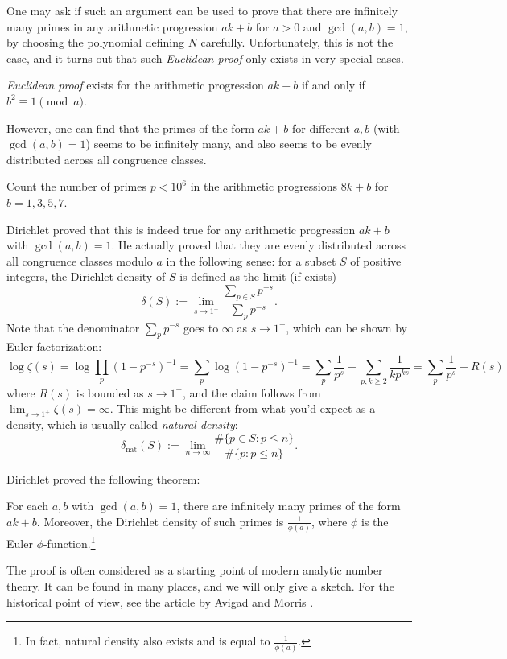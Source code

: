 One may ask if such an argument can be used to prove that there are infinitely many primes in any arithmetic progression $ak + b$ for $a > 0$ and $\gcd(a, b) = 1$, by choosing the polynomial defining $N$ carefully.
Unfortunately, this is not the case, and it turns out that such \emph{Euclidean proof} only exists in very special cases.
\begin{theorem}
    \emph{Euclidean proof} exists for the arithmetic progression $ak + b$ if and only if $b^2 \equiv 1 \pmod{a}$.
\end{theorem}
 
However, one can find that the primes of the form $ak + b$ for different $a, b$ (with $\gcd(a, b) = 1$) seems to be infinitely many, and also seems to be evenly distributed across all congruence classes.
\begin{exercise}\sage
    Count the number of primes $p < 10^6$ in the arithmetic progressions $8k + b$ for $b = 1, 3, 5, 7$.
\end{exercise}

Dirichlet \cite{dirichlet1837beweis} proved that this is indeed true for any arithmetic progression $ak + b$ with $\gcd(a, b) = 1$.
He actually proved that they are evenly distributed across all congruence classes modulo $a$ in the following sense: for a subset $S$ of positive integers, the Dirichlet density of $S$ is defined as the limit (if exists)
\begin{equation}
    \delta(S) := \lim_{s \to 1^+} \frac{\sum_{p \in S} p^{-s}}{\sum_{p} p^{-s}}.
    \label{eqn:dirichlet-density}
\end{equation}
Note that the denominator $\sum_p p^{-s}$ goes to $\infty$ as $s \to 1^+$, which can be shown by Euler factorization:
\[
\log \zeta(s) = \log \prod_p (1 - p^{-s})^{-1} = \sum_p \log(1 - p^{-s})^{-1} = \sum_p \frac{1}{p^s} + \sum_{p, k \ge 2} \frac{1}{k p^{ks}} = \sum_p \frac{1}{p^s} + R(s)
\]
where $R(s)$ is bounded as $s \to 1^+$, and the claim follows from $\lim_{s \to 1^+} \zeta(s) = \infty$.
This might be different from what you'd expect as a density, which is usually called \emph{natural density}:
\begin{equation}
    \delta_{\mathrm{nat}}(S) := \lim_{n \to \infty} \frac{\#\{p \in S : p \le n\}}{\#\{p : p \le n\}}.
\end{equation}

Dirichlet proved the following theorem:
\begin{theorem}
    \label{thm:dirichlet}
    For each $a, b$ with $\gcd(a, b) = 1$, there are infinitely many primes of the form $ak + b$.
    Moreover, the Dirichlet density of such primes is $\frac{1}{\phi(a)}$, where $\phi$ is the Euler $\phi$-function.\footnote{In fact, natural density also exists and is equal to $\frac{1}{\phi(a)}$.}
\end{theorem}
The proof is often considered as a starting point of modern analytic number theory.
It can be found in many places, and we will only give a sketch.
For the historical point of view, see the article by Avigad and Morris \cite{avigad2014concept}.

